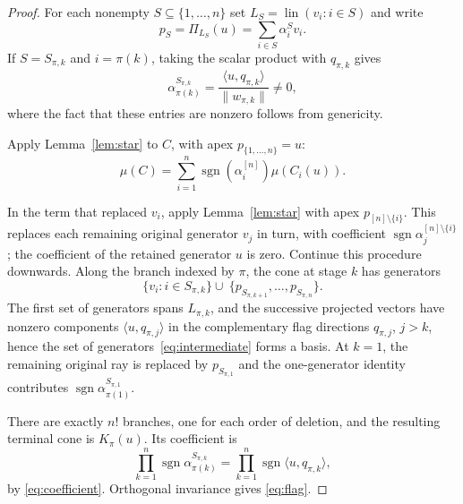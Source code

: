 \documentclass[11pt]{article}
\newcommand{\ip}[2]{\langle #1,#2\rangle}
\newcommand{\norm}[1]{\lVert #1\rVert}
\newcommand{\lin}{\operatorname{lin}}
\DeclareMathOperator{\sgn}{sgn}
\newtheorem{example}[theorem]{Example}
\begin{document}
\begin{proof}
For each nonempty $S\subseteq\{1,\ldots,n\}$ set $L_S=\lin(v_i\colon i\in S)$ and write
\[
 p_S=\Pi_{L_S}(u)=\sum_{i\in S}\alpha_i^S v_i.
\]
If $S=S_{\pi,k}$ and $i=\pi(k)$, taking the scalar product with
$q_{\pi,k}$ gives
\begin{equation}\label{eq:coefficient}
 \alpha_{\pi(k)}^{S_{\pi,k}}
   =\frac{\ip{u}{q_{\pi,k}}}{\norm{w_{\pi,k}}}\neq 0,
\end{equation}
where the fact that these entries are nonzero follows from genericity.

Apply Lemma~\ref{lem:star} to $C$, with apex
$p_{\{1,\ldots,n\}}=u$:
\begin{equation*}
  \mu(C)=\sum_{i=1}^n\sgn(\alpha_i^{[n]})\mu(C_i(u)).
\end{equation*}

In the term that replaced $v_i$, apply Lemma~\ref{lem:star} with apex
$p_{[n]\setminus\{i\}}$. This replaces each remaining original generator
$v_j$ in turn, with coefficient $\sgn\alpha_j^{[n]\setminus\{i\}}$;
the coefficient of the retained generator $u$ is zero.
Continue this procedure downwards. Along the branch
indexed by $\pi$, the cone at stage $k$ has generators
\begin{equation}\label{eq:intermediate}
 \{v_i\colon i\in S_{\pi,k}\} \cup\
 \{p_{S_{\pi,k+1}},\ldots,p_{S_{\pi,n}}\}.
\end{equation}
The first set of generators spans $L_{\pi,k}$, and the
successive projected vectors have nonzero components $\langle u,q_{\pi,j}\rangle$
in the complementary flag directions $q_{\pi,j}$, $j>k$, hence the set of generators~\eqref{eq:intermediate}
forms a basis. At $k=1$, the remaining original ray is replaced by
$p_{S_{\pi,1}}$ and the one-generator identity contributes
$\sgn\alpha_{\pi(1)}^{S_{\pi,1}}$.

There are exactly $n!$ branches, one for each order of deletion, and
the resulting terminal cone is $K_\pi(u)$. Its coefficient is
\[
 \prod_{k=1}^n\sgn\alpha_{\pi(k)}^{S_{\pi,k}}
 =\prod_{k=1}^n\sgn\ip{u}{q_{\pi,k}},
\]
by \eqref{eq:coefficient}.
Orthogonal invariance gives \eqref{eq:flag}.
\end{proof}

\end{document}
